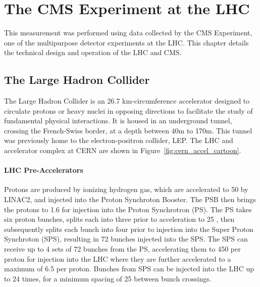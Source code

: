 \chapter{The CMS Experiment at the LHC}\label{ch:exp}
This measurement was performed using data collected by the CMS Experiment, one of the multipurpose detector experiments at the LHC. This chapter details the technical design and operation of the LHC and CMS. 


\section{The Large Hadron Collider}
The Large Hadron Collider is an 26.7 km-circumference accelerator designed to circulate protons or heavy nuclei in opposing directions to facilitate the study of fundamental physical interactions. It is housed in an underground tunnel, crossing the French-Swiss border, at a depth between 40m to 170m. This tunnel was previously home to the electron-positron collider, LEP. The LHC and accelerator complex at CERN are shown in Figure~\ref{fig:cern_accel_cartoon}.



\subsubsection{LHC Pre-Accelerators}
Protons are produced by ionizing hydrogen gas, which are accelerated to 50 \MeV by LINAC2, and injected into the Proton Synchroton Booster. The PSB then brings the protons to 1.6 \GeV for injection into the Proton Synchrotron (PS). The PS takes six proton bunches, splits each into three prior to acceleration to 25 \GeV, then subsequently splits each bunch into four prior to injection into the Super Proton Synchroton (SPS), resulting in 72 bunches injected into the SPS. The SPS can receive up to 4 sets of 72 bunches from the PS, accelerating them to 450 \GeV per proton for injection into the LHC where they are further accelerated to a maximum of 6.5 \TeV per proton. Bunches from SPS can be injected into the LHC up to 24 times, for a minimum spacing of 25 \ns between bunch crossings\cite{Benedikt:2004wm}. 

